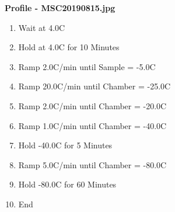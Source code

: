 \documentclass[UTF8,10pt,a4paper,fontset=fandol]{ctexart}
\newcommand{\fieldvalue}[1]{#1}
\begin{document}
\noindent
\begin{minipage}[t]{0.48\linewidth}
\textbf{Profile - MSC20190815.jpg}

\begin{enumerate}
\item Wait at
\fieldvalue{4.0\textdegree C}

\item Hold at
\fieldvalue{4.0\textdegree C} for
\fieldvalue{10 Minutes}

\item Ramp
\fieldvalue{2.0\textdegree C/min} until Sample =
\fieldvalue{-5.0\textdegree C}

\item Ramp
\fieldvalue{20.0\textdegree C/min} until Chamber =
\fieldvalue{-25.0\textdegree C}

\item Ramp
\fieldvalue{2.0\textdegree C/min} until Chamber =
\fieldvalue{-20.0\textdegree C}

\item Ramp
\fieldvalue{1.0\textdegree C/min} until Chamber =
\fieldvalue{-40.0\textdegree C}

\item Hold
\fieldvalue{-40.0\textdegree C} for
\fieldvalue{5 Minutes}

\item Ramp
\fieldvalue{5.0\textdegree C/min} until Chamber =
\fieldvalue{-80.0\textdegree C}

\item Hold
\fieldvalue{-80.0\textdegree C} for
\fieldvalue{60 Minutes}

\item End
\end{enumerate}
\end{minipage}
\end{document}
